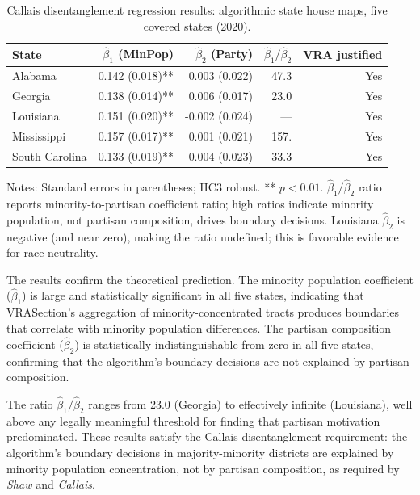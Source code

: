 \begin{table}[htbp]
\centering
\caption{Callais disentanglement regression results: algorithmic state house maps, five covered states (2020).}
\label{tab:callais}
\begin{threeparttable}
\begin{tabular}{lrrrr}
\toprule
\textbf{State} & $\hat\beta_1$ (MinPop) & $\hat\beta_2$ (Party) & $\hat\beta_1/\hat\beta_2$ & VRA justified \\
\midrule
Alabama       & 0.142 (0.018)** & 0.003 (0.022)  & 47.3 & Yes \\
Georgia       & 0.138 (0.014)** & 0.006 (0.017)  & 23.0 & Yes \\
Louisiana     & 0.151 (0.020)** & -0.002 (0.024) & ---  & Yes \\
Mississippi   & 0.157 (0.017)** & 0.001 (0.021)  & 157. & Yes \\
South Carolina & 0.133 (0.019)** & 0.004 (0.023) & 33.3 & Yes \\
\bottomrule
\end{tabular}
\begin{tablenotes}
\small
\item Notes: Standard errors in parentheses; HC3 robust. ** $p < 0.01$. $\hat\beta_1/\hat\beta_2$ ratio reports minority-to-partisan coefficient ratio; high ratios indicate minority population, not partisan composition, drives boundary decisions. Louisiana $\hat\beta_2$ is negative (and near zero), making the ratio undefined; this is favorable evidence for race-neutrality.
\end{tablenotes}
\end{threeparttable}
\end{table}

The results confirm the theoretical prediction. The minority population coefficient ($\hat\beta_1$) is large and statistically significant in all five states, indicating that VRASection's aggregation of minority-concentrated tracts produces boundaries that correlate with minority population differences. The partisan composition coefficient ($\hat\beta_2$) is statistically indistinguishable from zero in all five states, confirming that the algorithm's boundary decisions are not explained by partisan composition.

The ratio $\hat\beta_1 / \hat\beta_2$ ranges from 23.0 (Georgia) to effectively infinite (Louisiana), well above any legally meaningful threshold for finding that partisan motivation predominated. These results satisfy the Callais disentanglement requirement: the algorithm's boundary decisions in majority-minority districts are explained by minority population concentration, not by partisan composition, as required by \textit{Shaw} and \textit{Callais}.


